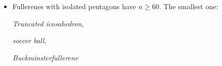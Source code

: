 \documentclass{beamer}
\begin{document}
{\begin{itemize}
\item Fullerenes with isolated pentagons have $n\geq 60$. The smallest one:
\begin{center}
\begin{minipage}{4.5cm}
\centering
{}\par
\end{minipage}
\begin{minipage}{4.5cm}
\centering
{\em Truncated icosahedron},\par
{\em soccer ball},\par
{\em Buckminsterfullerene}
\end{minipage}


\end{center}
\end{itemize}
}
\end{document}

